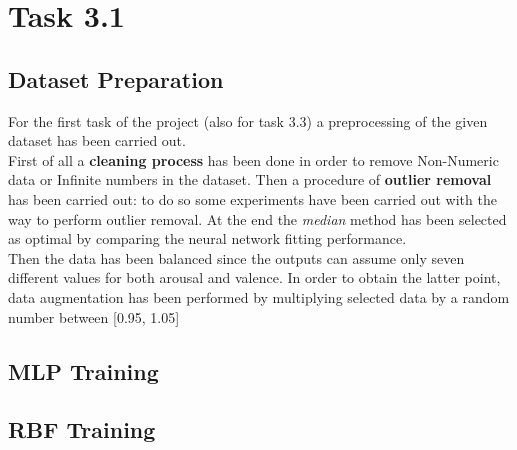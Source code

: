 \section{Task 3.1}
\subsection{Dataset Preparation}
For the first task of the project (also for task 3.3) a preprocessing of the given dataset has been carried out.\\
First of all a \textbf{cleaning process} has been done in order to remove Non-Numeric data or Infinite numbers in the dataset.
Then a procedure of \textbf{outlier removal} has been carried out: to do so some experiments have been carried out with the way to perform outlier removal. At the end the \textit{median} method has been selected as optimal by comparing the neural network fitting performance. \\
Then the data has been balanced since the outputs can assume only seven different values for both arousal and valence. In order to obtain the latter point, data augmentation has been performed by multiplying selected data by a random number between [0.95, 1.05]

\subsection{MLP Training}
\subsection{RBF Training}
